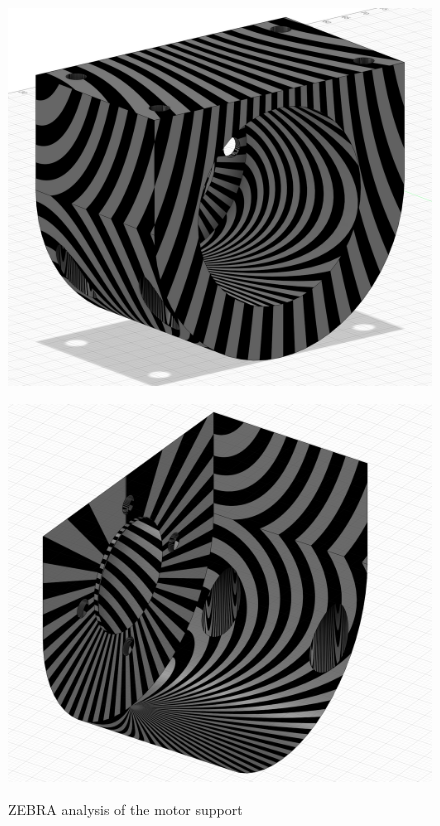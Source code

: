 \documentclass[11pt]{article}
\begin{document}
\begin{figure}[H]
    \centering
    \begin{minipage}{0.45\textwidth}
        \includegraphics[width=\textwidth]{images/ZEBRA/motorSupport1.png}
        \label{fig:zebra_motor_support}
    \end{minipage}
    \hfill
    \begin{minipage}{0.45\textwidth}
        \includegraphics[width=\textwidth]{images/ZEBRA/motorSupport2.png}
        \label{fig:zebra_motor_support2}
    \end{minipage}
    \caption{ZEBRA analysis of the motor support}
\end{figure}
\end{document}
